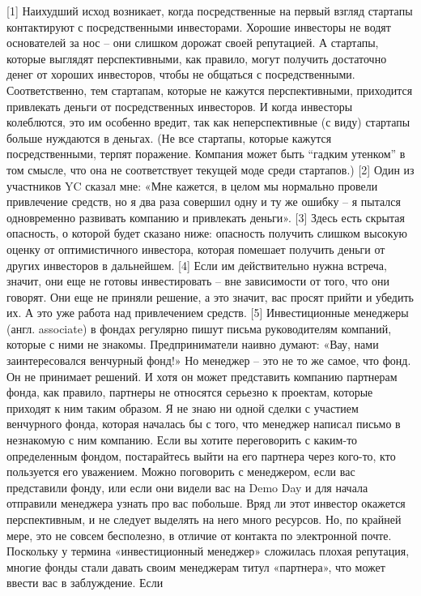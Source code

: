 \documentclass[ebook,12pt,oneside,openany]{memoir}
\begin{document}
[1] Наихудший исход возникает, когда посредственные на первый взгляд
стартапы контактируют с посредственными инвесторами. Хорошие инвесторы
не водят основателей за нос – они слишком дорожат своей репутацией. А
стартапы, которые выглядят перспективными, как правило, могут получить
достаточно денег от хороших инвесторов, чтобы не общаться с
посредственными. Соответственно, тем стартапам, которые не кажутся
перспективными, приходится привлекать деньги от посредственных
инвесторов. И когда инвесторы колеблются, это им особенно вредит, так
как неперспективные (с виду) стартапы больше нуждаются в деньгах. (Не
все стартапы, которые кажутся посредственными, терпят поражение.
Компания может быть “гадким утенком” в том смысле, что она не
соответствует текущей моде среди стартапов.) [2] Один из участников YC
сказал мне: «Мне кажется, в целом мы нормально провели привлечение
средств, но я два раза совершил одну и ту же ошибку – я пытался
одновременно развивать компанию и привлекать деньги». [3] Здесь есть
скрытая опасность, о которой будет сказано ниже: опасность получить
слишком высокую оценку от оптимистичного инвестора, которая помешает
получить деньги от других инвесторов в дальнейшем. [4] Если им
действительно нужна встреча, значит, они еще не готовы инвестировать –
вне зависимости от того, что они говорят. Они еще не приняли решение,
а это значит, вас просят прийти и убедить их. А это уже работа над
привлечением средств. [5] Инвестиционные менеджеры (англ. associate) в
фондах регулярно пишут письма руководителям компаний, которые с ними
не знакомы. Предприниматели наивно думают: «Вау, нами заинтересовался
венчурный фонд!» Но менеджер – это не то же самое, что фонд. Он не
принимает решений. И хотя он может представить компанию партнерам
фонда, как правило, партнеры не относятся серьезно к проектам, которые
приходят к ним таким образом. Я не знаю ни одной сделки с участием
венчурного фонда, которая началась бы с того, что менеджер написал
письмо в незнакомую с ним компанию. Если вы хотите переговорить с
каким-то определенным фондом, постарайтесь выйти на его партнера через
кого-то, кто пользуется его уважением. Можно поговорить с менеджером,
если вас представили фонду, или если они видели вас на Demo Day и для
начала отправили менеджера узнать про вас побольше. Вряд ли этот
инвестор окажется перспективным, и не следует выделять на него много
ресурсов. Но, по крайней мере, это не совсем бесполезно, в отличие от
контакта по электронной почте. Поскольку у термина «инвестиционный
менеджер» сложилась плохая репутация, многие фонды стали давать своим
менеджерам титул «партнера», что может ввести вас в заблуждение. Если
\end{document}
